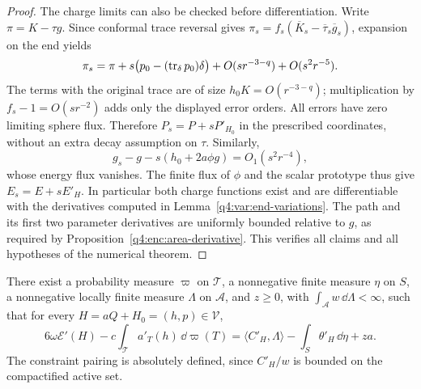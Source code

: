 \begin{proof}
The charge limits can also be checked before differentiation. Write
$\pi=K-\tau g$. Since conformal trace reversal gives
$\pi_s=f_s(\overline K_s-\overline\tau_s\overline g_s)$, expansion on the
end yields
\[
 \pi_s=\pi+s\bigl(p_0-(\operatorname{tr}_\delta p_0)\delta\bigr)
          +O(sr^{-3-q})+O(s^2r^{-5}).
\]
The terms with the original trace are of size
$h_0K=O(r^{-3-q})$; multiplication by $f_s-1=O(sr^{-2})$ adds only the
displayed error orders. All errors have zero limiting sphere flux.
Therefore $P_s=P+sP'_{H_0}$ in the prescribed coordinates, without an
extra decay assumption on $\tau$. Similarly,
\[
 g_s-g-s(h_0+2a\phi g)=O_1(s^2r^{-4}),
\]
whose energy flux vanishes. The finite flux of $\phi$ and the scalar
prototype thus give $E_s=E+sE'_H$. In particular both charge functions
exist and are differentiable with the derivatives computed in
Lemma~\ref{q4:var:end-variations}. The path and its
first two parameter derivatives are uniformly bounded relative to $g$,
as required by Proposition~\ref{q4:enc:area-derivative}. This verifies all
claims and all hypotheses of the numerical theorem.
\end{proof}

\begin{proposition}
\label{q4:var:multiplier}
There exist a probability measure $\varpi$ on $\mathcal T$, a nonnegative
finite measure $\eta$ on $S$, a nonnegative locally finite measure
$\Lambda$ on $\mathcal A$, and $z\ge0$, with
$\int_{\mathcal A}w\,\dd\Lambda<\infty$, such that for every
$H=aQ+H_0=(h,p)\in\mathcal V$,
\begin{equation}
 6\omega\mathcal E'(H)-c\int_{\mathcal T}a'_T(h)\,\dd\varpi(T)
   =\langle C'_H,\Lambda\rangle
      -\int_S\theta'_H\,\dd\eta+za.
\label{q4:var:measure-identity}
\end{equation}
The constraint pairing is absolutely defined, since $C'_H/w$ is bounded
on the compactified active set.
\end{proposition}

